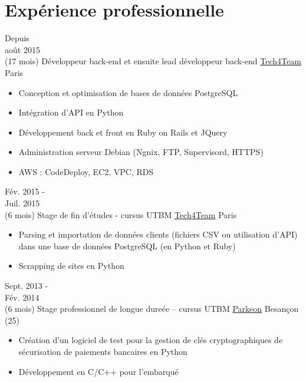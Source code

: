 \documentclass[letterpaper]{twentysecondcv} %
\begin{document}
\section{Expérience professionnelle}
\begin{twenty}
	\twentyitem
    	{Depuis \\ août 2015 \\ (17 mois)}
        {Développeur back-end et ensuite lead développeur back-end}
        {\href{http://www.tech4team.fr}{Tech4Team}}
        {Paris}
        {
        {\begin{itemize}
        	\item Conception et optimisation de bases de données PostgreSQL
	        \item Intégration d’API en Python
	        \item Développement back et front en Ruby on Rails et JQuery
	        \item Administration serveur Debian (Ngnix, FTP, Supervisord, HTTPS)
	        \item AWS : CodeDeploy, EC2, VPC, RDS
	    \end{itemize}}
        }
    \twentyitem
    	{Fév. 2015 - \\ Juil. 2015 \\ (6 mois)}
        {Stage de fin d'études - cursus UTBM}
        {\href{http://www.tech4team.fr}{Tech4Team}}
        {Paris}
        {
        {\begin{itemize}
        	\item Parsing et importation de données clients (fichiers CSV ou utilisation d'API) dans une base de données PostgreSQL (en Python et Ruby)
	        \item Scrapping de sites en Python
	    \end{itemize}}
        }
     \twentyitem
    	{Sept. 2013 - \\ Fév. 2014 \\ (6 mois)}
        {Stage professionnel de longue dureée – cursus UTBM}
        {\href{http://parkeon.fr}{Parkeon}}
        {Besançon (25)}
        {
        {\begin{itemize}
        	\item Création d'un logiciel de test pour la gestion de clés cryptographiques de sécurisation de paiements bancaires en Python
	        \item Développement en C/C++ pour l’embarqué
	    \end{itemize}}
        }
\end{twenty}
\end{document}
